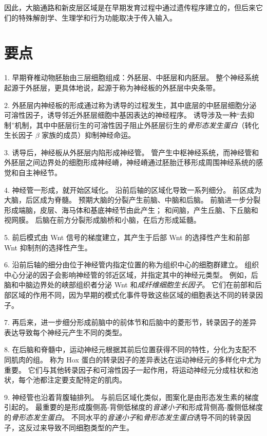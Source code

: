 因此，大脑通路和新皮层区域是在早期发育过程中通过遗传程序建立的，但后来它们的特殊解剖学、生理学和行为功能取决于传入输入。



\section{要点}

1. 早期脊椎动物胚胎由三层细胞组成：外胚层、中胚层和内胚层。
整个神经系统起源于外胚层，更具体地说，起源于称为神经板的外胚层中央条带。 


2. 外胚层内神经板的形成通过称为诱导的过程发生，其中底层的中胚层细胞分泌可溶性因子，诱导邻近外胚层细胞中基因表达的神经程序。
诱导涉及一种“去抑制”机制，其中中胚层衍生的可溶性因子阻止外胚层衍生的\textit{骨形态发生蛋白}（转化生长因子 $\beta$ 家族的成员）抑制神经命运。 


3. 诱导后，神经板从外胚层内陷形成神经管。
管产生中枢神经系统，而神经管和外胚层之间边界处的细胞形成神经嵴，神经嵴通过胚胎迁移形成周围神经系统的感觉和自主神经节。


4. 神经管一形成，就开始区域化。
沿前后轴的区域化导致一系列细分。
前区成为大脑，后区成为脊髓。 预期大脑的分裂产生前脑、中脑和后脑。
前脑进一步分裂形成端脑，皮层、海马体和基底神经节由此产生；
和间脑，产生丘脑、下丘脑和视网膜。
后脑在前方分裂形成脑桥和小脑，在后方形成延髓。


5. 前后模式由 Wnt 信号的梯度建立，其产生于后部 Wnt 的选择性产生和前部 Wnt 抑制剂的选择性产生。 


6. 沿前后轴的细分由位于神经管内指定位置的称为组织中心的细胞群建立。
组织中心分泌的因子会影响神经管的邻近区域，并指定其中的神经元类型。
例如，后脑和中脑边界处的峡部组织者分泌 Wnt 和\textit{成纤维细胞生长因子}。
它们在前部和后部区域的作用不同，因为早期的模式化事件导致这些区域的细胞表达不同的转录因子。


7. 再后来，进一步细分形成前脑中的前体节和后脑中的菱形节，转录因子的差异表达导致每个神经元产生不同的类型。 


8. 在后脑和脊髓中，运动神经元根据其前后位置获得不同的特性，分化为支配不同肌肉的组。
称为 Hox 蛋白的转录因子的差异表达在运动神经元的多样化中尤为重要。
它们与其他转录因子和可溶性因子一起作用，将运动神经元分成柱状和池状，每个池都注定要支配特定的肌肉。 


9. 神经管也沿着背腹轴排列。
与前后区域化类似，图案化是由形态发生素的梯度引起的。
最重要的是形成腹侧高-背侧低梯度的\textit{音速小子}和形成背侧高-腹侧低梯度的\textit{骨形态发生蛋白}。
不同水平的\textit{音速小子}和\textit{骨形态发生蛋白}诱导不同的转录因子，这反过来导致不同细胞类型的产生。 


